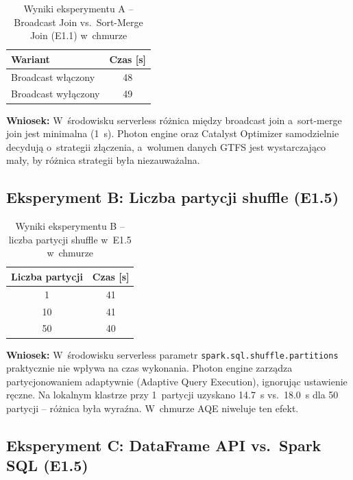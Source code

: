 \documentclass{labreport}
\begin{document}
\begin{table}[H]
\centering
\caption{Wyniki eksperymentu A -- Broadcast Join vs.\ Sort-Merge Join (E1.1) w~chmurze}
\label{tab:broadcast}
\renewcommand{\arraystretch}{1.3}
\begin{tabular}{|l|c|}
\hline
\rowcolor{gray!20}
\textbf{Wariant} & \textbf{Czas [s]} \\ \hline
Broadcast włączony  & 48 \\ \hline
Broadcast wyłączony & 49 \\ \hline
\end{tabular}
\end{table}

\textbf{Wniosek:} W~środowisku serverless różnica między broadcast join a~sort-merge join jest minimalna (1~s). Photon engine oraz Catalyst Optimizer samodzielnie decydują o~strategii złączenia, a~wolumen danych GTFS jest wystarczająco mały, by różnica strategii była niezauważalna.

\subsection{Eksperyment B: Liczba partycji shuffle (E1.5)}

\begin{table}[H]
\centering
\caption{Wyniki eksperymentu B -- liczba partycji shuffle w~E1.5 w~chmurze}
\label{tab:partitions}
\renewcommand{\arraystretch}{1.3}
\begin{tabular}{|c|c|}
\hline
\rowcolor{gray!20}
\textbf{Liczba partycji} & \textbf{Czas [s]} \\ \hline
1  & 41 \\ \hline
10 & 41 \\ \hline
50 & 40 \\ \hline
\end{tabular}
\end{table}

\textbf{Wniosek:} W~środowisku serverless parametr \texttt{spark.sql.shuffle.partitions} praktycznie nie wpływa na czas wykonania. Photon engine zarządza partycjonowaniem adaptywnie (Adaptive Query Execution), ignorując ustawienie ręczne. Na lokalnym klastrze przy 1~partycji uzyskano 14.7~s vs.\ 18.0~s dla 50 partycji -- różnica była wyraźna. W~chmurze AQE niweluje ten efekt.

\subsection{Eksperyment C: DataFrame API vs.\ Spark SQL (E1.5)}
\end{document}
